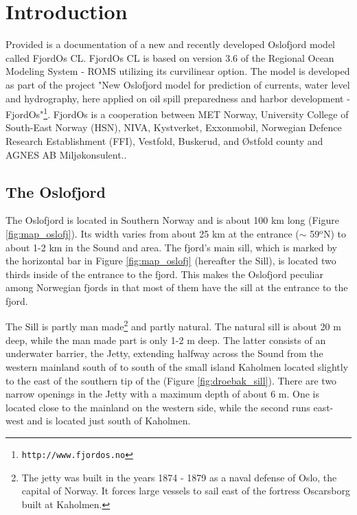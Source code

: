 \section{Introduction}
\label{sec:intro}
Provided is a documentation of a new and recently developed Oslofjord model called FjordOs CL. FjordOs CL is based on version 3.6 of the Regional Ocean Modeling System - ROMS \citep{haidv:etal:2008, shche:mcwil:2005, shche:mcwil:2009} utilizing its curvilinear option. The model is developed as part of the project "New Oslofjord model for prediction of currents, water level and hydrography, here applied on oil spill preparedness and harbor development - FjordOs"\footnote{\texttt{http://www.fjordos.no}}. FjordOs is a cooperation between MET Norway, University College of  South-East Norway (HSN), NIVA, Kystverket, Exxonmobil, Norwegian Defence Research Establishment (FFI), Vestfold, Buskerud, and {\O}stfold county and AGNES AB Miljøkonsulent.. 

\subsection{The Oslofjord}
\label{subsec:oslofjord}
The Oslofjord is located in Southern Norway and is about 100 km long (Figure \ref{fig:map_oslofj}). Its width varies from about 25 km at the entrance ($\sim$ 59$^\text{o}$N) to about 1-2 km in the {\DR} Sound and {\DR} area. The fjord's main sill, which is marked by the horizontal bar in Figure \ref{fig:map_oslofj} (hereafter the {\DR} Sill), is located two thirds inside of the entrance to the fjord. This makes the Oslofjord peculiar among Norwegian fjords in that most of them have the sill at the entrance to the fjord. 


The {\DR} Sill is partly man made\footnote{The jetty was built in the years 1874 - 1879 as a naval defense of Oslo, the capital of Norway. It forces large vessels to sail east of the fortress Oscarsborg built at Kaholmen.} and partly natural. The natural sill is about 20 m deep, while the man made part is only 1-2 m deep. The latter consists of an underwater barrier, the {\DR} Jetty, extending halfway across the {\DR} Sound from the western mainland south of {\DR} to south of the small island Kaholmen located slightly to the east of the southern tip of the {\HAA} (Figure \ref{fig:droebak_sill}). There are two narrow openings in the Jetty with a maximum depth of about 6 m. One is located close to the mainland on the western side, while the second runs east-west and is located just south of Kaholmen.   
 

